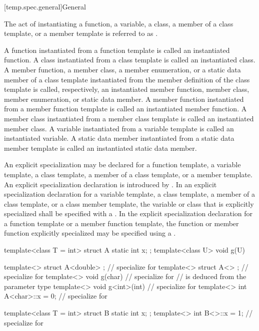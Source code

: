 [temp.spec.general]{General}

\pnum
{}%
The act of instantiating a function, a variable,
a class, a member of a class template, or
a member template is referred to as
.

\pnum
A function instantiated from a function template is called an instantiated
function.
A class instantiated from a class template is called an instantiated class.
A member function, a member class, a member enumeration, or a static data member of a class template
instantiated from the member definition of the class template is called,
respectively, an instantiated member function, member class, member enumeration, or static data
member.
A member function instantiated from a member function template is called an
instantiated member function.
A member class instantiated from a member class template is called an
instantiated member class.
A variable instantiated from a variable template is called an
instantiated variable.
A static data member instantiated from a static data member template
is called an instantiated static data member.

\pnum
An explicit specialization may be declared for a function template,
a variable template, a class template, a member of a class template, or
a member template.
An explicit specialization declaration is introduced by
.
In an explicit specialization declaration for
a variable template, a class template,
a member of a class template, or a class member template,
the variable or class that is explicitly specialized
shall be specified with a .
In the explicit specialization declaration for a function template or
a member function template,
the function or member function explicitly specialized may be specified
using a .
\begin{example}
\begin{codeblock}
template<class T = int> struct A {
  static int x;
};
template<class U> void g(U) { }

template<> struct A<double> { };        // specialize for 
template<> struct A<> { };              // specialize for 
template<> void g(char) { }             // specialize for 
                                        //  is deduced from the parameter type
template<> void g<int>(int) { }         // specialize for 
template<> int A<char>::x = 0;          // specialize for 

template<class T = int> struct B {
  static int x;
};
template<> int B<>::x = 1;              // specialize for 
\end{codeblock}
\end{example}

